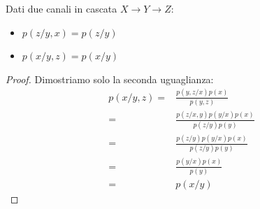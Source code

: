 \begin{lemma}
\mbox{}

Dati due canali in cascata $X \to Y \to Z$:
 \begin{itemize}
  \item $p(z/y,x)=p(z/y)$
  \item $p(x/y,z)=p(x/y)$
 \end{itemize}
 \begin{proof}
  Dimostriamo solo la seconda uguaglianza:
  \[\begin{split}
   p(x/y,z)=& \frac{p(y,z/x)p(x)}{p(y,z)} \\
   =&\frac{p(z/x,y)p(y/x)p(x)}{p(z/y)p(y)} \\
   =&\frac{p(z/y)p(y/x)p(x)}{p(z/y)p(y)} \\
   =&\frac{p(y/x)p(x)}{p(y)} \\
   =&p(x/y)
    \end{split}
  \]

 \end{proof}
\label{lem:cascata}
\end{lemma}

